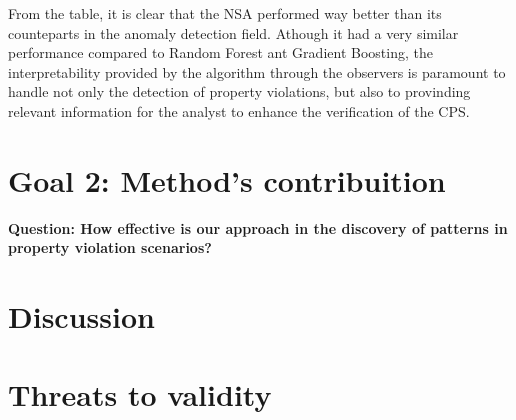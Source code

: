 From the table, it is clear that the NSA performed way better than its counteparts in the anomaly detection field. Athough it had a very similar performance compared to Random Forest ant Gradient Boosting, the interpretability provided by the algorithm through the observers is paramount to handle not only the detection of property violations, but also to provinding relevant information for the analyst to enhance the verification of the CPS.

\section{Goal 2: Method's contribuition}
\textbf{Question: How effective is our approach in the discovery of patterns in property violation scenarios?}


\section{Discussion}

\section{Threats to validity}